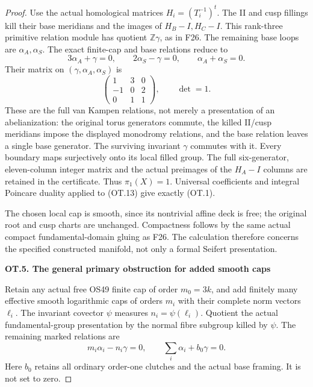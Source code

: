 \begin{proof}
Use the actual homological matrices \(H_i=(T_i^{-1})^t\). The II and cusp
fillings kill their base meridians and the images of \(H_B-I,H_C-I\). This
rank-three primitive relation module has quotient \(\mathbb Z\gamma\), as in F26.
The remaining base loops are \(\alpha_A,\alpha_S\). The exact finite-cap and
base relations reduce to
\[
 3\alpha_A+\gamma=0,\qquad 2\alpha_S-\gamma=0,
                  \qquad \alpha_A+\alpha_S=0.             \tag{OT.14}
\]
Their matrix on \((\gamma,\alpha_A,\alpha_S)\) is
\[
                  \begin{pmatrix}1&3&0\\-1&0&2\\0&1&1\end{pmatrix},
                     \qquad\det=1.                      \tag{OT.15}
\]
These are the full van Kampen relations, not merely a presentation of an
abelianization: the original torus generators commute, the killed II/cusp
meridians impose the displayed monodromy relations, and the base relation
leaves a single base generator. The surviving invariant \(\gamma\) commutes
with it. Every boundary maps surjectively onto its local filled group.
The full six-generator, eleven-column integer matrix and the actual
preimages of the \(H_A-I\) columns are retained in the certificate. Thus
\(\pi_1(X)=1\). Universal coefficients and integral Poincare duality applied
to (OT.13) give exactly (OT.1).

The chosen local cap is smooth, since its nontrivial affine deck is free;
the original root and cusp charts are unchanged. Compactness follows by
the same actual compact fundamental-domain gluing as F26. The calculation
therefore concerns the specified constructed manifold, not only a formal
Seifert presentation.

\par

\medskip\noindent\textbf{OT.5. The general primary obstruction for added smooth caps}

\par\nobreak

Retain any actual free OS49 finite cap of order \(m_0=3k\), and add finitely
many effective smooth logarithmic caps of orders \(m_i\) with their complete
norm vectors \(\ell_i\). The invariant covector \(\psi\) measures \(n_i=\psi(\ell_i)\).
Quotient the actual fundamental-group presentation by the normal fibre
subgroup killed by \(\psi\). The remaining marked relations are
\[
 m_i\alpha_i-n_i\gamma=0,\qquad
                  \sum_i\alpha_i+b_0\gamma=0.             \tag{OT.16}
\]
Here \(b_0\) retains all ordinary order-one clutches and the actual base
framing. It is not set to zero.


\end{proof}
